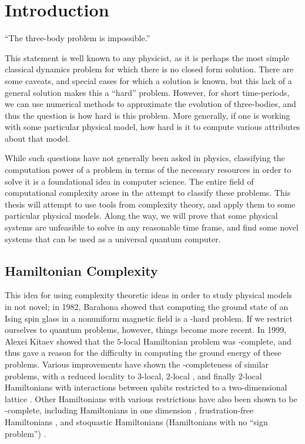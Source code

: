 \documentclass[../thesis-main/thesis-main]{subfiles}
\begin{document}
\chapter{Introduction}
\label{chap:introduction}

``The three-body problem is impossible.''

This statement is well known to any physicist, as it is perhaps the most simple classical dynamics problem for which there is no closed form solution.  There are some caveats, and special cases for which a solution is known, but this lack of a general solution makes this a ``hard'' problem.  However, for short time-periods, we can use numerical methods to approximate the evolution of three-bodies, and thus the question is how hard is this problem.  More generally, if one is working with some particular physical model, how hard is it to compute various attributes about that model.

While such questions have not generally been asked in physics, classifying the computation power of a problem in terms of the necessary resources in order to solve it is a foundational idea in computer science.  The entire field of computational complexity arose in the attempt to classify these problems.  This thesis will attempt to use tools from complexity theory, and apply them to some particular physical models.  Along the way, we will prove that some physical systems are unfeasible to solve in any reasonable time frame, and find some novel systems that can be used as a universal quantum computer.

\section{Hamiltonian Complexity}

This idea for using complexity theoretic ideas in order to study physical models in not novel; in 1982, Barahona \cite{Bar82} showed that computing the ground state of an Ising spin glass in a nonuniform magnetic field is a \NP-hard problem.  If we restrict ourselves to quantum problems, however, things become more recent. In 1999, Alexei Kitaev \cite{KSV02} showed that the $5$-local Hamiltonian problem was \QMA-complete, and thus gave a reason for the difficulty in computing the ground energy of these problems.  Various improvements have shown the \QMA-completeness of similar problems, with a reduced locality to $3$-local\cite{KR03}, $2$-local \cite{KKR04}, and finally $2$-local Hamiltonians with interactions between qubits restricted to a two-dimensional lattice \cite{OT05}.  Other Hamiltonians with various restrictions have also been shown to be \QMA-complete, including Hamiltonians in one dimension \cite{AGIK09,GI09}, frustration-free Hamiltonians \cite{Bra06,GN13}, and stoquastic Hamiltonians (Hamiltonians with no ``sign problem'') \cite{BDOT08,BT09}.
\end{document}
